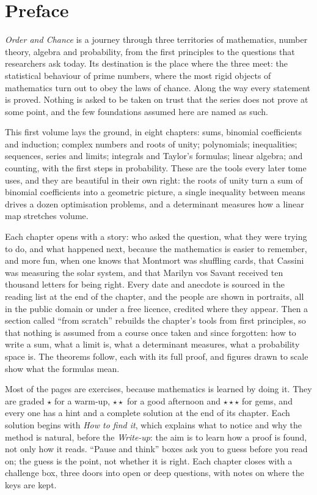 \chapter*{Preface}
\emph{Order and Chance} is a journey through three territories of mathematics, number theory, algebra and
probability, from the first principles to the questions that researchers ask today. Its destination is the place
where the three meet: the statistical behaviour of prime numbers, where the most rigid objects of mathematics turn
out to obey the laws of chance. Along the way every statement is proved. Nothing is asked to be taken on trust
that the series does not prove at some point, and the few foundations assumed here are named as such.

This first volume lays the ground, in eight chapters: sums, binomial coefficients and induction; complex numbers
and roots of unity; polynomials; inequalities; sequences, series and limits; integrals and Taylor's formulas;
linear algebra; and counting, with the first steps in probability. These are the tools every later tome uses, and
they are beautiful in their own right: the roots of unity turn a sum of binomial coefficients into a geometric
picture, a single inequality between means drives a dozen optimisation problems, and a determinant measures how a
linear map stretches volume.

Each chapter opens with a story: who asked the question, what they were trying to do, and what happened next, because
the mathematics is easier to remember, and more fun, when one knows that Montmort was shuffling cards, that Cassini was
measuring the solar system, and that Marilyn vos Savant received ten thousand letters for being right. Every date and
anecdote is sourced in the reading list at the end of the chapter, and the people are shown in portraits, all in the
public domain or under a free licence, credited where they appear. Then a section called ``from scratch'' rebuilds the
chapter's tools from first principles, so that nothing is assumed from a course once taken and since forgotten: how to
write a sum, what a limit is, what a determinant measures, what a probability space is. The theorems follow, each with
its full proof, and figures drawn to scale show what the formulas mean.

Most of the pages are exercises, because mathematics is learned by doing it. They are graded \textbf{$\star$} for a
warm-up, \textbf{$\star\star$} for a good afternoon and \textbf{$\star\star\star$} for gems, and every one has a hint
and a complete solution at the end of its chapter. Each solution begins with \emph{How to find it}, which explains what
to notice and why the method is natural, before the \emph{Write-up}: the aim is to learn how a proof is found, not only
how it reads. ``Pause and think'' boxes ask you to guess before you read on; the guess is the point, not whether it is
right. Each chapter closes with a challenge box, three doors into open or deep questions, with notes on where the keys
are kept.

